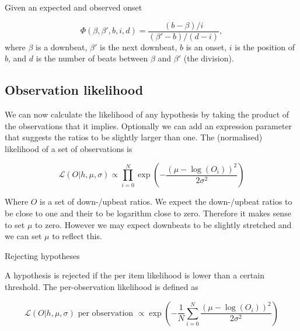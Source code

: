 Given an expected and observed onset

\begin{equation}
\Phi(\beta, \beta', b, i, d) = \frac{(b - \beta) / i}{(\beta' - b) / (d - i)},
\end{equation}
where $\beta$ is a downbeat, $\beta'$ is the next downbeat, $b$ is an onset, $i$ is the position of $b$, and $d$ is the number of beats between $\beta$ and $\beta'$ (the division).

\subsection{Observation likelihood}
\label{sec:likelihood}

We can now calculate the likelihood of any hypothesis by taking the product of the observations that it implies. Optionally we can add an expression parameter that suggests the ratios to be slightly larger than one. The (normalised) likelihood of a set of observations is

\begin{equation}
\label{eq:h_likelihood}
\mathcal{L}(O|h, \mu, \sigma) \propto \prod_{i=0}^N \exp\left(-\frac{(\mu - \log(O_i))^2}{2\sigma^2}\right)
\end{equation}

Where $O$ is a set of down-/upbeat ratios. We expect the down-/upbeat ratios to be close to one and their to be logarithm close to zero. Therefore it makes sense to set $\mu$ to zero. However we may expect downbeats to be slightly stretched and we can set $\mu$ to reflect this.

Rejecting hypotheses

A hypothesis is rejected if the per item likelihood is lower than a certain threshold. The per-observation likelihood is defined as

\begin{equation}
\label{eq:per_obs_likelihood}
\mathcal{L}(O|h, \mu, \sigma) \mbox{ per observation } \propto \exp\left(-\frac{1}{N}\sum_{i=0}^N \frac{(\mu - \log(O_i))^2}{2\sigma^2}\right)
\end{equation}







